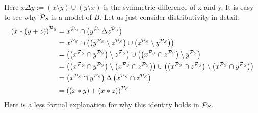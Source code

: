 	Here $x\Delta y:=(x\setminus y)\cup(y\setminus x)$ is the symmetric difference of x and y. It is easy to see why ${\mathcal{P}_S}$ is a model of $B$. Let us just consider distributivity in detail:
	\begin{align*}
		\left( x*\left( y+z\right) \right) ^{\mathcal{P}_S} & =x^{\mathcal{P}_S}\cap\left( y^{\mathcal{P}_S}\Delta z^{\mathcal{P}_S}\right)                                                                                                                                                \\
		                                          & =x^{\mathcal{P}_S}\cap\left( \left( y^{\mathcal{P}_S}\setminus z^{\mathcal{P}_S}\right) \cup\left( z^{\mathcal{P}_S}\setminus y^{\mathcal{P}_S}\right) \right)                                                                                   \\
		                                          & =\left( \left( x^{\mathcal{P}_S}\cap y^{\mathcal{P}_S}\right) \setminus z^{\mathcal{P}_S}\right) \cup\left( \left( x^{\mathcal{P}_S}\cap z^{\mathcal{P}_S}\right) \setminus y^{\mathcal{P}_S}\right)                                                       \\
		                                          & =\left( \left( x^{\mathcal{P}_S}\cap y^{\mathcal{P}_S}\right) \setminus \left( x^{\mathcal{P}_S}\cap z^{\mathcal{P}_S}\right) \right) \cup\left( \left( x^{\mathcal{P}_S}\cap z^{\mathcal{P}_S}\right) \setminus \left( x^{\mathcal{P}_S}\cap y^{\mathcal{P}_S}\right) \right) \\
		                                          & =\left( x^{\mathcal{P}_S}\cap y^{\mathcal{P}_S}\right) \Delta \left( x^{\mathcal{P}_S}\cap z^{\mathcal{P}_S}\right)                                                                                                                    \\
		                                          & =\left( \left( x*y\right) +\left( x*z\right)\right)^{\mathcal{P}_S}                                                                                                                                      
	\end{align*}
	Here is a less formal explanation for why this identity holds in ${\mathcal{P}_S}$.\\
	\def\f{1.3}
	\def\CircleX{(\f*0.5,\f*0.866) circle (\f*0.8)}
	\def\CircleY{(\f*0,0) circle (\f*0.8)}
	\def\CircleZ{(\f*1,0) circle (\f*0.8)}
